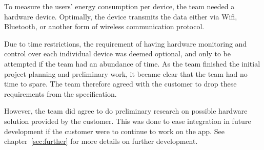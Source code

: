 \noindent To measure the users' energy consumption per device, the team needed a hardware device. Optimally, the device transmits the data either via Wifi, Bluetooth, or another form of wireless communication protocol.

Due to time restrictions, the requirement of having hardware monitoring and control over each individual device was deemed optional, and only to be attempted if the team had an abundance of time. As the team finished the initial project planning and preliminary work, it became clear that the team had no time to spare. The team therefore agreed with the customer to drop these requirements from the specification. 

However, the team did agree to do preliminary research on possible hardware solution provided by the customer. This was done to ease integration in future development if the customer were to continue to work on the app. See chapter~\ref{sec:further} for more details on further development.
\newpage
 
